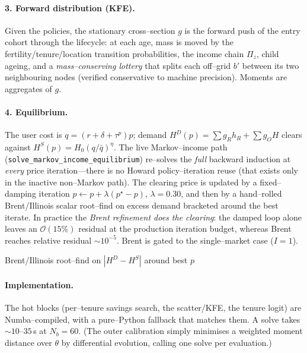 \documentclass[11pt]{article}
\begin{document}
\paragraph{3. Forward distribution (KFE).} Given the policies, the stationary cross--section $g$ is the
forward push of the entry cohort through the lifecycle: at each age, mass is moved by the
fertility/tenure/location transition probabilities, the income chain $\Pi_z$, child ageing, and a
\emph{mass--conserving lottery} that splits each off--grid $b'$ between its two neighbouring nodes
(verified conservative to machine precision). Moments are aggregates of $g$.

\paragraph{4. Equilibrium.} The user cost is $q=(r+\delta+\tau^p)p$; demand $H^D(p)=\sum g_R h_R+\sum g_O H$
clears against $H^S(p)=H_0(q/\bar q)^{\eta}$. The live Markov--income path
(\texttt{solve\_markov\_income\_equilibrium}) re--solves the \emph{full} backward induction at \emph{every}
price iteration---there is no Howard policy--iteration reuse (that exists only in the inactive non--Markov
path). The clearing price is updated by a fixed--damping iteration $p\leftarrow p+\lambda(p^\star-p)$,
$\lambda{=}0.30$, and then by a hand--rolled Brent/Illinois scalar root--find on excess demand bracketed
around the best iterate. In practice the \emph{Brent refinement does the clearing}: the damped loop alone
leaves an $\mathcal O(15\%)$ residual at the production iteration budget, whereas Brent reaches relative
residual $\sim\!10^{-5}$. Brent is gated to the single--market case ($I{=}1$).

\begin{algorithm}[H]\small
\SetAlgoLined
{}
Brent/Illinois root--find on $|H^D-H^S|$ around best $p$ 
\caption{One solve of the model}
\end{algorithm}

\paragraph{Implementation.} The hot blocks (per--tenure savings search, the scatter/KFE, the tenure
logit) are Numba--compiled, with a pure--Python fallback that matches them. A solve takes
$\sim\!10$--$35$\,s at $N_b{=}60$. (The outer calibration simply minimises a weighted moment distance
over $\theta$ by differential evolution, calling one solve per evaluation.)
\end{document}
